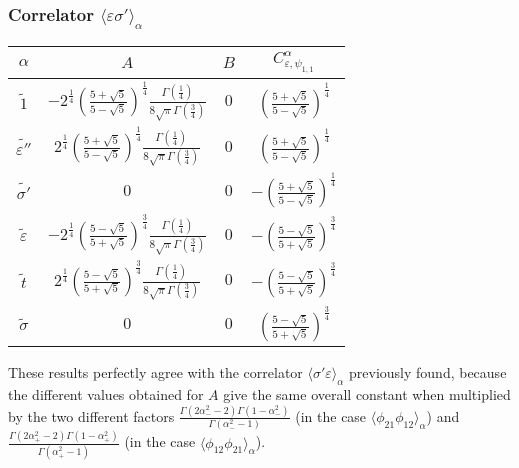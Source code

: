 \documentclass[a4paper,12pt]{report}
\begin{document}
\subsubsection{Correlator $\langle \varepsilon \sigma'\rangle_{\alpha}$}
\begin{center}
\begin{tabular}{|c|c|c|c|}\hline
$\alpha$ &  $A$  & $B$ & $ C_{\varepsilon,\psi_{1,1}}^{\alpha}$  \\
\hline

$\tilde{1}$ & $-2^{\frac{1}{4}}\left(\frac{5+\sqrt{5}}{5-\sqrt{5}} \right)^{\frac{1}{4}}\frac{\Gamma \left(\frac{1}{4} \right)}{8\sqrt{\pi }\Gamma \left(\frac{3}{4} \right)}$ & $0$ & $\left(\frac{5+\sqrt{5}}{5-\sqrt{5}} \right)^{\frac{1}{4}}$ \\

$\tilde{\varepsilon''}$ & $2^{\frac{1}{4}}\left(\frac{5+\sqrt{5}}{5-\sqrt{5}} \right)^{\frac{1}{4}}\frac{\Gamma \left(\frac{1}{4} \right)}{8\sqrt{\pi }\Gamma \left(\frac{3}{4} \right)}$ & $0$ & $\left(\frac{5+\sqrt{5}}{5-\sqrt{5}} \right)^{\frac{1}{4}}$ \\

$\tilde{\sigma'}$ & $0$ & $0$ & $-\left(\frac{5+\sqrt{5}}{5-\sqrt{5}} \right)^{\frac{1}{4}}$ \\

$\tilde{\varepsilon}$ & $-2^{\frac{1}{4}}\left(\frac{5-\sqrt{5}}{5+\sqrt{5}} \right)^{\frac{3}{4}}\frac{\Gamma
\left(\frac{1}{4} \right)}{8\sqrt{\pi }\Gamma \left(\frac{3}{4} \right)}$ & $0$ & $-\left(\frac{5-\sqrt{5}}{5+\sqrt{5}} \right)^{\frac{3}{4}}$ \\

$\tilde{t}$ & $2^{\frac{1}{4}}\left(\frac{5-\sqrt{5}}{5+\sqrt{5}} \right)^{\frac{3}{4}}\frac{\Gamma
\left(\frac{1}{4} \right)}{8\sqrt{\pi }\Gamma \left(\frac{3}{4} \right)}$ & $0$ & $-\left(\frac{5-\sqrt{5}}{5+\sqrt{5}} \right)^{\frac{3}{4}}$ \\

$\tilde{\sigma}$ & $0$ & $0$ & $\left(\frac{5-\sqrt{5}}{5+\sqrt{5}}
\right)^{\frac{3}{4}}$ \\
\hline
\end{tabular}
\end{center}

These results perfectly agree with the correlator $ \langle \sigma' \varepsilon \rangle _{\alpha}$ previously
found, because the different values obtained for $A$ give the same overall constant when multiplied by the two
different factors $\frac{\Gamma \left(2\alpha _{-}^{2}-2 \right)\Gamma \left(1-\alpha _{-}^{2} \right)}{\Gamma
\left(\alpha _{-}^{2}-1 \right)}$ (in the case $\langle\phi _{21}\phi _{12} \rangle _{\alpha}$) and $\frac{\Gamma
\left(2\alpha _{+}^{2}-2 \right)\Gamma \left(1-\alpha _{+}^{2} \right)}{\Gamma \left(\alpha _{+}^{2}-1 \right)}$
(in the case $\langle\phi _{12}\phi _{21} \rangle _{\alpha}$).
\end{document}
